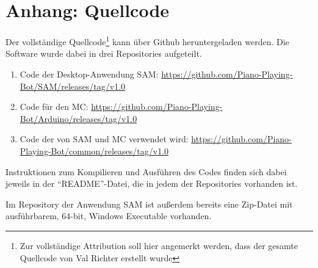 \chapter{Anhang: Quellcode} \label{appndix-code}

Der vollständige Quellcode\footnote{Zur vollständige Attribution soll hier angemerkt werden, dass der gesamte Quellcode von Val Richter erstellt wurde} kann über Github heruntergeladen werden.
Die Software wurde dabei in drei Repositories aufgeteilt.

\begin{enumerate}
	\item Code der Desktop-Anwendung \ac{SAM}: \url{https://github.com/Piano-Playing-Bot/SAM/releases/tag/v1.0}
	\item Code für den \ac{MC}: \url{https://github.com/Piano-Playing-Bot/Arduino/releases/tag/v1.0}
	\item Code der von \ac{SAM} und \ac{MC} verwendet wird: \url{https://github.com/Piano-Playing-Bot/common/releases/tag/v1.0}
\end{enumerate}

Instruktionen zum Kompilieren und Ausführen des Codes finden sich dabei jeweils in der \enquote{README}-Datei, die in jedem der Repositories vorhanden ist.

Im Repository der Anwendung \ac{SAM} ist außerdem bereits eine Zip-Datei mit ausführbarem, 64-bit, Windows Executable vorhanden.
